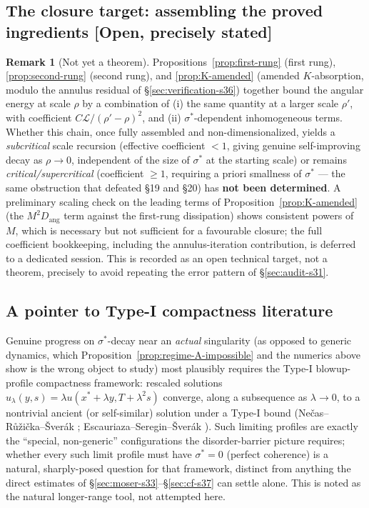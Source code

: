 \documentclass[11pt]{article}
\theoremstyle{definition}
\newtheorem{remark}[theorem]{Remark}
\theoremstyle{remark}
\begin{document}
\subsection{The closure target: assembling the proved ingredients [Open, precisely stated]}

\begin{remark}[Not yet a theorem]
Propositions~\ref{prop:first-rung} (first rung), \ref{prop:second-rung}
(second rung), and \ref{prop:K-amended} (amended $K$-absorption, modulo
the annulus residual of \S\ref{sec:verification-s36}) together bound the
angular energy at scale $\rho$ by a combination of (i) the same quantity
at a larger scale $\rho'$, with coefficient $C\mathcal{L}/(\rho'-\rho)^2$,
and (ii) $\sigma^*$-dependent inhomogeneous terms. Whether this chain, once
fully assembled and non-dimensionalized, yields a \emph{subcritical} scale
recursion (effective coefficient $<1$, giving genuine self-improving decay
as $\rho\to0$, independent of the size of $\sigma^*$ at the starting
scale) or remains \emph{critical/supercritical} (coefficient $\geq1$,
requiring a priori smallness of $\sigma^*$ --- the same obstruction that
defeated \S19 and \S20) has \textbf{not been determined}. A preliminary
scaling check on the leading terms of Proposition~\ref{prop:K-amended}
(the $M^2 D_{\mathrm{ang}}$ term against the first-rung dissipation) shows
consistent powers of $M$, which is necessary but not sufficient for a
favourable closure; the full coefficient bookkeeping, including the
annulus-iteration contribution, is deferred to a dedicated session. This
is recorded as an open technical target, not a theorem, precisely to avoid
repeating the error pattern of \S\ref{sec:audit-s31}.
\end{remark}

\subsection{A pointer to Type-I compactness literature}

Genuine progress on $\sigma^*$-decay near an \emph{actual} singularity (as
opposed to generic dynamics, which Proposition~\ref{prop:regime-A-impossible}
and the numerics above show is the wrong object to study) most plausibly
requires the Type-I blowup-profile compactness framework: rescaled
solutions $u_\lambda(y,s) = \lambda u(x^*+\lambda y, T+\lambda^2 s)$
converge, along a subsequence as $\lambda\to0$, to a nontrivial ancient
(or self-similar) solution under a Type-I bound
(Ne\v{c}as--R\r{u}\v{z}i\v{c}ka--\v{S}ver\'ak \cite{NecasRuzickaSverak1996};
Escauriaza--Seregin--\v{S}ver\'ak \cite{EscauriazaSereginSverak2003}). Such
limiting profiles are exactly the ``special, non-generic'' configurations
the disorder-barrier picture requires; whether every such limit profile
must have $\sigma^*=0$ (perfect coherence) is a natural, sharply-posed
question for that framework, distinct from anything the direct estimates
of \S\ref{sec:moser-s33}--\S\ref{sec:cf-s37} can settle alone. This is
noted as the natural longer-range tool, not attempted here.
\end{document}
